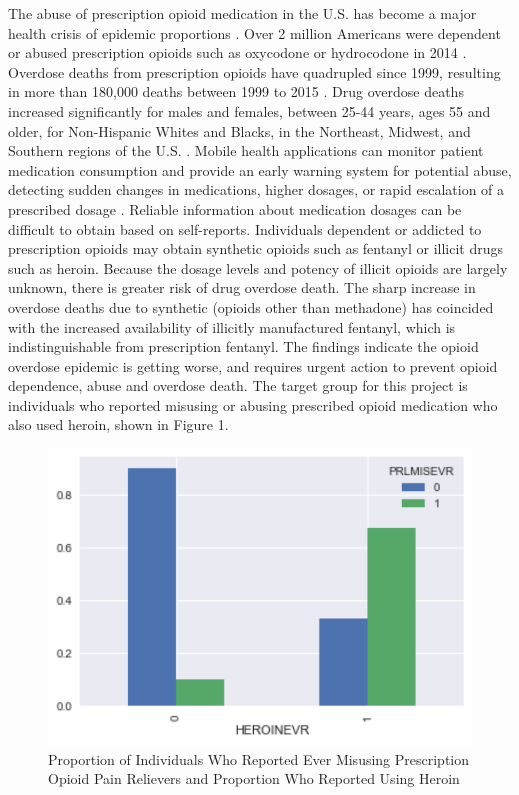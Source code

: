 \documentclass[sigconf]{acmart}
\begin{document}
The abuse of prescription opioid medication in the U.S. has become a major 
health crisis of epidemic proportions \cite{volkow14}. Over 2 million Americans 
were dependent or abused prescription opioids such as oxycodone or hydrocodone 
in 2014 \cite{cdc17}. Overdose deaths from prescription opioids have quadrupled 
since 1999, resulting in more than 180,000 deaths between 1999 to 2015 
\cite{nida17}. Drug overdose deaths increased significantly for males and 
females, between 25-44 years, ages 55 and older, for Non-Hispanic Whites and 
Blacks, in the Northeast, Midwest, and Southern regions of the U.S. 
\cite{cdc16}. Mobile health applications can monitor patient medication 
consumption and provide an early warning system for potential abuse, detecting 
sudden changes in medications, higher dosages, or rapid escalation of a 
prescribed dosage \cite{varshney13}. Reliable information about medication 
dosages can be difficult to obtain based on self-reports. Individuals dependent 
or addicted to prescription opioids may obtain synthetic opioids such as 
fentanyl or illicit drugs such as heroin. Because the dosage levels and potency 
of illicit opioids are largely unknown, there is greater risk of drug overdose 
death. The sharp increase in overdose deaths due to synthetic (opioids other 
than methadone) has coincided with the increased availability of illicitly
manufactured fentanyl, which is indistinguishable from prescription fentanyl. 
The findings indicate the opioid overdose epidemic is getting worse, and 
requires urgent action to prevent opioid dependence, abuse and overdose death. 
The target group for this project is individuals who reported misusing or 
abusing prescribed opioid medication who also used heroin, shown in Figure 1. 

\begin{figure}[!ht]
  \centering\includegraphics[width=\columnwidth]{images/Figure1.pdf}
  \caption{Proportion of Individuals Who Reported Ever Misusing Prescription
  Opioid Pain Relievers and Proportion Who Reported Using Heroin}
  \label{f:Figure1}
\end{figure}
\end{document}
